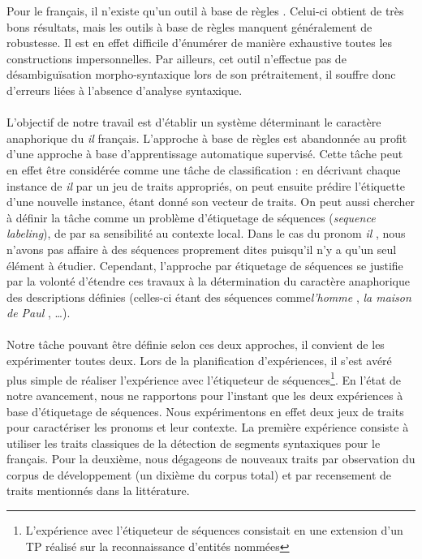 \documentclass[a4paper,12pt]{article}
\begin{document}
Pour le français, il n'existe qu'un outil à base de règles \citep{danlos-ilimp-taln2005}. Celui-ci obtient de très bons résultats, mais les outils à base de règles manquent généralement de robustesse. Il est en effet difficile d'énumérer de manière exhaustive toutes les constructions impersonnelles. Par ailleurs, cet outil n'effectue pas de désambiguïsation morpho-syntaxique lors de son prétraitement, il souffre donc d'erreurs liées à l'absence d'analyse syntaxique.

\paragraph{}
L'objectif de notre travail est d'établir un système déterminant le caractère anaphorique du \og{}\textit{il}\fg{} français. L'approche à base de règles est abandonnée au profit d'une approche à base d'apprentissage automatique supervisé. Cette tâche peut en effet être considérée comme une tâche de classification : en décrivant chaque instance de \og \textit{il} \fg{} par un jeu de traits appropriés, on peut ensuite prédire l'étiquette d'une nouvelle instance, étant donné son vecteur de traits. On peut aussi chercher à définir la tâche comme un problème d'étiquetage de séquences (\emph{sequence labeling}), de par sa sensibilité au contexte local. Dans le cas du pronom \og \textit{il} \fg{}, nous n'avons pas affaire à des séquences proprement dites puisqu'il n'y a qu'un seul élément à étudier. Cependant, l'approche par étiquetage de séquences se justifie par la volonté d'étendre ces travaux à la détermination du caractère anaphorique des descriptions définies (celles-ci étant des séquences comme\og \textit{l'homme} \fg{}, \og \textit{la maison de Paul} \fg{}, \ldots).

\paragraph{}
Notre tâche pouvant être définie selon ces deux approches, il convient de les expérimenter toutes deux. Lors de la planification d'expériences, il s'est avéré plus simple de réaliser l'expérience avec l'étiqueteur de séquences\footnote{\samepage L'expérience avec l'étiqueteur de séquences consistait en une extension d'un TP réalisé sur la reconnaissance d'entités nommées}.
En l'état de notre avancement, nous ne rapportons pour l'instant que les deux expériences à base d'étiquetage de séquences.
Nous expérimentons en effet deux jeux de traits pour caractériser les pronoms et leur contexte.
La première expérience consiste à utiliser les traits classiques de la détection de segments syntaxiques pour le français. Pour la deuxième, nous dégageons de nouveaux traits par observation du corpus de développement (un dixième du corpus total) et par recensement de traits mentionnés dans la littérature.
\end{document}
